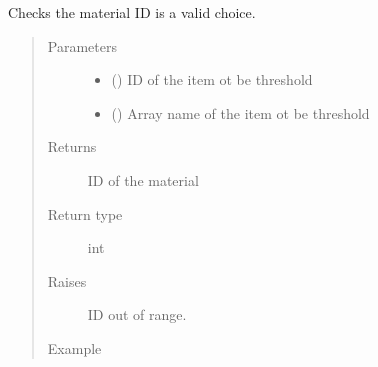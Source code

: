 \documentclass[letterpaper,10pt,english]{sphinxmanual}
\begin{document}
\begin{fulllineitems}
\begin{fulllineitems}
\label{\detokenize{openfdem:openfdem.openfdem.Model.threshold_bound_check}}
Checks the material ID is a valid choice.
\begin{quote}\begin{description}
\item[{Parameters}] \leavevmode\begin{itemize}
\item {} 
 () \textendash{} ID of the item ot be threshold

\item {} 
 () \textendash{} Array name of the item ot be threshold

\end{itemize}

\item[{Returns}] \leavevmode
ID of the material

\item[{Return type}] \leavevmode
int

\item[{Raises}] \leavevmode
{} \textendash{} ID out of range.

\item[{Example}] \leavevmode
\begin{sphinxVerbatim}[commandchars=\\\{\}]
   
  
\end{sphinxVerbatim}


\end{description}
\end{quote}
\end{fulllineitems}
\end{fulllineitems}
\end{document}
